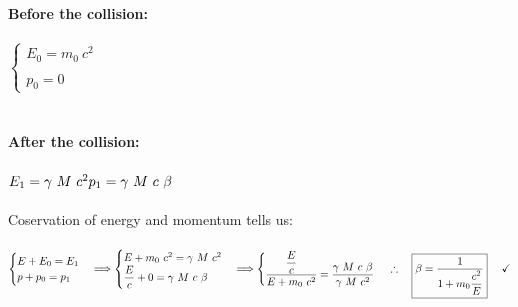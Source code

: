 \documentclass[fleqn]{article}
\begin{document}
\begin{enumerate}
      \textcolor{hwColor}{
        \\
        \textbf{Before the collision:}
        \\
        \\
        $
          \begin{cases}
            E_0=m_0 ~ c^2
            \\
            \\
            p_0=0
          \end{cases}
        $
        \\
        \\
        \\
        \textbf{After the collision:}
        \\
        \\
        $
          E_1=\gamma ~ M ~ c^2
          \\
          \\
          p_1=\gamma ~ M ~ c ~ \beta
        $
        \\
        \\
        Coservation of energy and momentum tells us:
        \\
        \\
        $
          \begin{cases}
            E+E_0=E_1
            \\
            p+p_0=p_1
          \end{cases} \Longrightarrow \begin{cases}
            E+m_0 ~ c^2=\gamma ~ M ~ c^2
            \\
            \dfrac{E}{c}+0=\gamma ~ M ~ c ~ \beta
          \end{cases}
           \Longrightarrow \begin{cases}
             \dfrac{\dfrac{E}{c}}{E+m_0 ~ c^2}=\dfrac{\gamma ~ M ~ c ~ \beta}{\gamma ~ M ~ c^2}
           \end{cases}
           \\
           \\
           \\
           \therefore ~~~ \boxed{\beta=\dfrac{1}{1+m_0 \dfrac{c^2}{E}}} ~~~~ \checkmark
        $
      }
    

  \end{enumerate}
\end{document}
